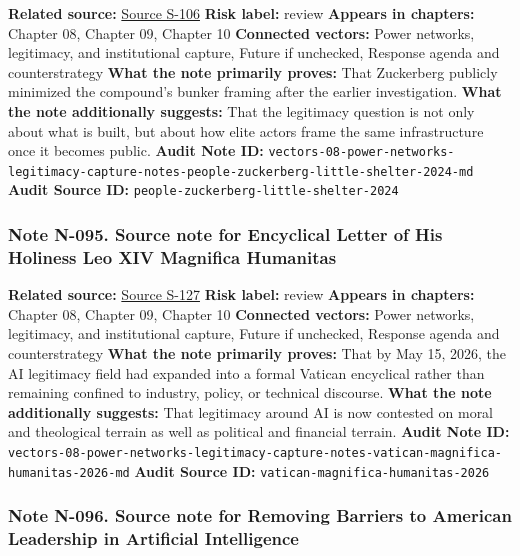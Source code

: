 \documentclass[
  american,
  11pt,
  letterpaper,
]{article}
\begin{document}
\textbf{Related source:}
\hyperref[source-s-106-mark-zuckerberg-downplays-his-5-000-square-foot-underground-bunker-in-hawaii-just-a-little-shelter]{Source
S-106} \textbf{Risk label:} review \textbf{Appears in chapters:} Chapter
08, Chapter 09, Chapter 10 \textbf{Connected vectors:} Power networks,
legitimacy, and institutional capture, Future if unchecked, Response
agenda and counterstrategy \textbf{What the note primarily proves:} That
Zuckerberg publicly minimized the compound's bunker framing after the
earlier investigation. \textbf{What the note additionally suggests:}
That the legitimacy question is not only about what is built, but about
how elite actors frame the same infrastructure once it becomes public.
\textbf{Audit Note ID:}
\texttt{vectors-08-power-networks-legitimacy-capture-notes-people-zuckerberg-little-shelter-2024-md}
\textbf{Audit Source ID:} \texttt{people-zuckerberg-little-shelter-2024}

\subsubsection{Note N-095. Source note for Encyclical Letter of His
Holiness Leo XIV Magnifica
Humanitas}\label{note-n-095-vectors-08-power-networks-legitimacy-capture-notes-vatican-magnifica-humanitas-2026-md}

\textbf{Related source:}
\hyperref[source-s-127-encyclical-letter-of-his-holiness-leo-xiv-magnifica-humanitas]{Source
S-127} \textbf{Risk label:} review \textbf{Appears in chapters:} Chapter
08, Chapter 09, Chapter 10 \textbf{Connected vectors:} Power networks,
legitimacy, and institutional capture, Future if unchecked, Response
agenda and counterstrategy \textbf{What the note primarily proves:} That
by May 15, 2026, the AI legitimacy field had expanded into a formal
Vatican encyclical rather than remaining confined to industry, policy,
or technical discourse. \textbf{What the note additionally suggests:}
That legitimacy around AI is now contested on moral and theological
terrain as well as political and financial terrain. \textbf{Audit Note
ID:}
\texttt{vectors-08-power-networks-legitimacy-capture-notes-vatican-magnifica-humanitas-2026-md}
\textbf{Audit Source ID:} \texttt{vatican-magnifica-humanitas-2026}

\subsubsection{Note N-096. Source note for Removing Barriers to American
Leadership in Artificial
Intelligence}\label{note-n-096-vectors-08-power-networks-legitimacy-capture-notes-whitehouse-eo-14179-2025-md}
\end{document}
